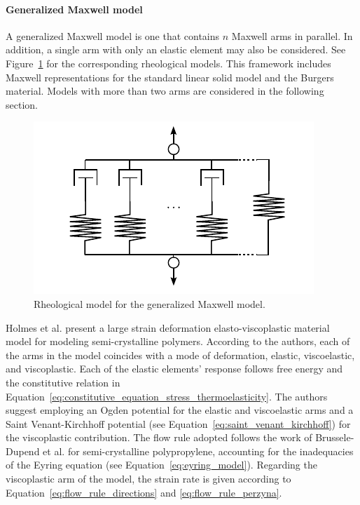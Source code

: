 \paragraph{Generalized Maxwell model}
A generalized Maxwell model is one that contains $n$ Maxwell arms in parallel.
In addition, a single arm with only an elastic element may also be considered.
See Figure~\ref{fig:rheo_model_gen_maxwell} for the corresponding rheological models.
This framework includes Maxwell representations for the standard linear solid model and the Burgers material.
Models with more than two arms are considered in the following section.
\begin{figure}[htbp]
	\centering
	\includegraphics{figures/rheo_model_gen_maxwell}
	\caption{Rheological model for the generalized Maxwell model.}
\label{fig:rheo_model_gen_maxwell}
\end{figure}

Holmes et al. \citep{holmesConstitutiveModelLarge2006} present a large strain deformation elasto-viscoplastic material model for modeling semi-crystalline polymers.
According to the authors, each of the arms in the model coincides with a mode of deformation, elastic, viscoelastic, and viscoplastic.
Each of the elastic elements' response follows free energy and the constitutive relation in Equation~\eqref{eq:constitutive_equation_stress_thermoelasticity}.
The authors suggest employing an Ogden potential for the elastic and viscoelastic arms and a Saint Venant-Kirchhoff potential (see Equation~\eqref{eq:saint_venant_kirchhoff}) for the viscoplastic contribution.
The flow rule adopted follows the work of
Brussele-Dupend et al. \citep{brusselle_dupendMechanical2001, brusselle_dupendMechanical2003} for semi-crystalline polypropylene, accounting for the inadequacies of the Eyring equation (see Equation~\eqref{eq:eyring_model}).
Regarding the viscoplastic arm of the model, the strain rate is given according to Equation~\eqref{eq:flow_rule_directions} and \eqref{eq:flow_rule_perzyna}.

